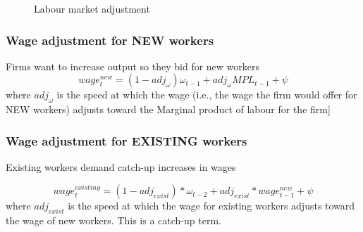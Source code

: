 \begin{figure}
    \centering
    \caption {Labour market adjustment}
    \label{fig:cobweb2}
\end{figure}

\color{blue}
    \subsubsection{Wage adjustment for NEW workers} 
Firms want to increase output so they bid for new workers
\begin{equation}wage_t^{new}= (1-adj_\omega)\omega_{t-1} + adj_\omega MPL_{t-1}  +\psi\end{equation}
where $adj_\omega$ is the speed at which the wage (i.e., the wage the firm would offer for NEW workers) adjusts toward the Marginal product of labour for the firm]
\subsubsection{Wage adjustment for EXISTING workers }
Existing workers demand catch-up increases in wages

\begin{equation} wage_t^{existing}= (1-adj_{exist})*\omega_{t-2} + adj_{exist}* wage_{t-1}^{new}  +\psi 
\end{equation}
where $adj_{exist}$ is the speed at which the wage for existing workers adjusts toward the wage of new workers. This is a catch-up term.


